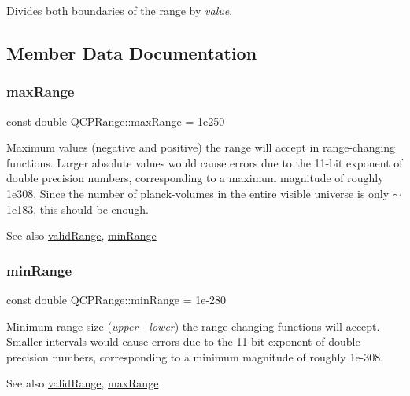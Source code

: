Divides both boundaries of the range by {\itshape value}. 

\subsection{Member Data Documentation}
\mbox{\label{class_q_c_p_range_a5ca51e7a2dc5dc0d49527ab171fe1f4f}} 
\subsubsection{\texorpdfstring{max\+Range}{maxRange}}
{\footnotesize\ttfamily const double Q\+C\+P\+Range\+::max\+Range = 1e250\hspace{0.3cm}{\ttfamily [static]}}

Maximum values (negative and positive) the range will accept in range-\/changing functions. Larger absolute values would cause errors due to the 11-\/bit exponent of double precision numbers, corresponding to a maximum magnitude of roughly 1e308. Since the number of planck-\/volumes in the entire visible universe is only $\sim$1e183, this should be enough. \begin{DoxySeeAlso}{See also}
\mbox{\hyperlink{class_q_c_p_range_ab38bd4841c77c7bb86c9eea0f142dcc0}{valid\+Range}}, \mbox{\hyperlink{class_q_c_p_range_ab46d3bc95030ee25efda41b89e2b616b}{min\+Range}} 
\end{DoxySeeAlso}
\mbox{\label{class_q_c_p_range_ab46d3bc95030ee25efda41b89e2b616b}} 
\subsubsection{\texorpdfstring{min\+Range}{minRange}}
{\footnotesize\ttfamily const double Q\+C\+P\+Range\+::min\+Range = 1e-\/280\hspace{0.3cm}{\ttfamily [static]}}

Minimum range size ({\itshape upper} -\/ {\itshape lower}) the range changing functions will accept. Smaller intervals would cause errors due to the 11-\/bit exponent of double precision numbers, corresponding to a minimum magnitude of roughly 1e-\/308. \begin{DoxySeeAlso}{See also}
\mbox{\hyperlink{class_q_c_p_range_ab38bd4841c77c7bb86c9eea0f142dcc0}{valid\+Range}}, \mbox{\hyperlink{class_q_c_p_range_a5ca51e7a2dc5dc0d49527ab171fe1f4f}{max\+Range}} 
\end{DoxySeeAlso}


